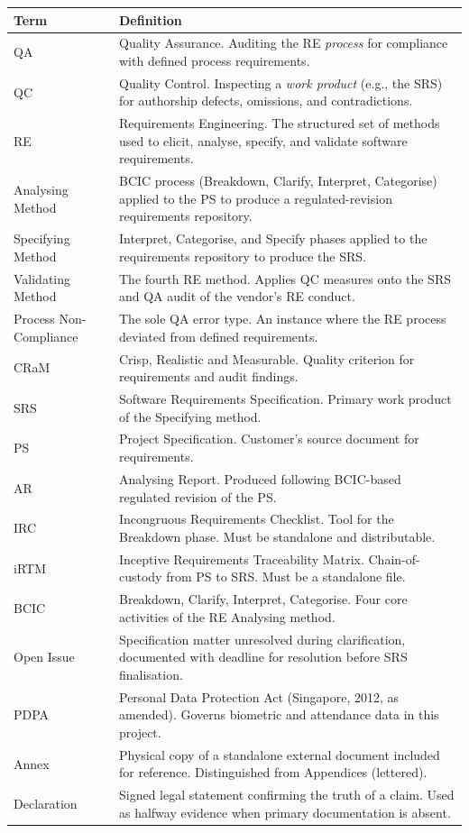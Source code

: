 \documentclass[11pt,a4paper]{article}
\begin{document}
\begin{longtable}{|L{2.5cm}|L{10.5cm}|}
\hline
{}
\textbf{Term} & \textbf{Definition} \\
\hline
\endhead
QA & Quality Assurance. Auditing the RE \emph{process} for compliance with defined process requirements. \\\hline
QC & Quality Control. Inspecting a \emph{work product} (e.g., the SRS) for authorship defects, omissions, and contradictions. \\\hline
RE & Requirements Engineering. The structured set of methods used to elicit, analyse, specify, and validate software requirements. \\\hline
Analysing Method & BCIC process (Breakdown, Clarify, Interpret, Categorise) applied to the PS to produce a regulated-revision requirements repository. \\\hline
Specifying Method & Interpret, Categorise, and Specify phases applied to the requirements repository to produce the SRS. \\\hline
Validating Method & The fourth RE method. Applies QC measures onto the SRS and QA audit of the vendor's RE conduct. \\\hline
Process Non-Compliance & The sole QA error type. An instance where the RE process deviated from defined requirements. \\\hline
CRaM & Crisp, Realistic and Measurable. Quality criterion for requirements and audit findings. \\\hline
SRS & Software Requirements Specification. Primary work product of the Specifying method. \\\hline
PS & Project Specification. Customer's source document for requirements. \\\hline
AR & Analysing Report. Produced following BCIC-based regulated revision of the PS. \\\hline
IRC & Incongruous Requirements Checklist. Tool for the Breakdown phase. Must be standalone and distributable. \\\hline
iRTM & Inceptive Requirements Traceability Matrix. Chain-of-custody from PS to SRS. Must be a standalone file. \\\hline
BCIC & Breakdown, Clarify, Interpret, Categorise. Four core activities of the RE Analysing method. \\\hline
Open Issue & Specification matter unresolved during clarification, documented with deadline for resolution before SRS finalisation. \\\hline
PDPA & Personal Data Protection Act (Singapore, 2012, as amended). Governs biometric and attendance data in this project. \\\hline
Annex & Physical copy of a standalone external document included for reference. Distinguished from Appendices (lettered). \\\hline
Declaration & Signed legal statement confirming the truth of a claim. Used as halfway evidence when primary documentation is absent. \\\hline
\end{longtable}
\end{document}
